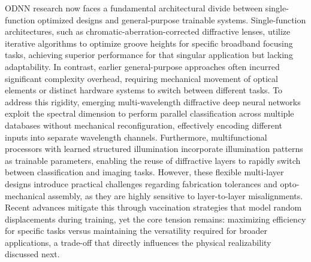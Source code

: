 \documentclass[11pt]{article}
\begin{document}
ODNN research now faces a fundamental architectural divide between single-function optimized designs and general-purpose trainable systems. Single-function architectures, such as chromatic-aberration-corrected diffractive lenses, utilize iterative algorithms to optimize groove heights for specific broadband focusing tasks, achieving superior performance for that singular application but lacking adaptability. In contrast, earlier general-purpose approaches often incurred significant complexity overhead, requiring mechanical movement of optical elements or distinct hardware systems to switch between different tasks. To address this rigidity, emerging multi-wavelength diffractive deep neural networks exploit the spectral dimension to perform parallel classification across multiple databases without mechanical reconfiguration, effectively encoding different inputs into separate wavelength channels. Furthermore, multifunctional processors with learned structured illumination incorporate illumination patterns as trainable parameters, enabling the reuse of diffractive layers to rapidly switch between classification and imaging tasks. However, these flexible multi-layer designs introduce practical challenges regarding fabrication tolerances and opto-mechanical assembly, as they are highly sensitive to layer-to-layer misalignments. Recent advances mitigate this through vaccination strategies that model random displacements during training, yet the core tension remains: maximizing efficiency for specific tasks versus maintaining the versatility required for broader applications, a trade-off that directly influences the physical realizability discussed next. \citep{doi_10_1038_srep21545_ae20cc7d} \citep{doi_10_1515_nanoph_2022_0615_9a3be8d6} \citep{doi_10_1364_ol_591818_8738c4b1} \citep{doi_10_1515_nanoph_2020_0291_c4a9f42d}
\end{document}
